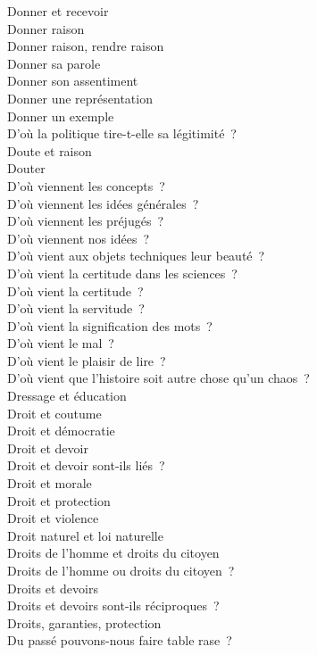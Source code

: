 \documentclass[a4paper,12pt]{article}
\begin{document}
Donner et recevoir \\
Donner raison \\
Donner raison, rendre raison \\
Donner sa parole \\
Donner son assentiment \\
Donner une représentation \\
Donner un exemple \\
D'où la politique tire-t-elle sa légitimité ? \\
Doute et raison \\
Douter \\
D'où viennent les concepts ? \\
D'où viennent les idées générales ? \\
D'où viennent les préjugés ? \\
D'où viennent nos idées ? \\
D'où vient aux objets techniques leur beauté ? \\
D'où vient la certitude dans les sciences ? \\
D'où vient la certitude ? \\
D'où vient la servitude ? \\
D'où vient la signification des mots ? \\
D'où vient le mal ? \\
D'où vient le plaisir de lire ? \\
D'où vient que l'histoire soit autre chose qu'un chaos ? \\
Dressage et éducation \\
Droit et coutume \\
Droit et démocratie \\
Droit et devoir \\
Droit et devoir sont-ils liés ? \\
Droit et morale \\
Droit et protection \\
Droit et violence \\
Droit naturel et loi naturelle \\
Droits de l'homme et droits du citoyen \\
Droits de l'homme ou droits du citoyen ? \\
Droits et devoirs \\
Droits et devoirs sont-ils réciproques ? \\
Droits, garanties, protection \\
Du passé pouvons-nous faire table rase ? \\
\end{document}

